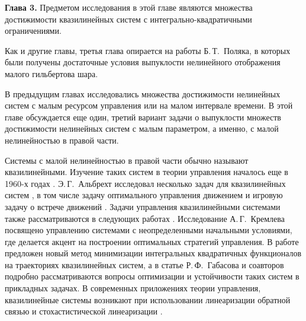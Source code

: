 \documentclass[../main.tex]{subfiles}
\begin{document}
\textbf{Глава 3. }
Предметом исследования в этой главе являются множества достижимости квазилинейных систем с интегрально-квадратичными ограничениями.

Как и другие главы, третья глава опирается на работы Б.\,Т.~Поляка\cite{Polyak2001}, в которых были получены достаточные условия выпуклости нелинейного отображения малого гильбертова шара.

В предыдущим главах исследовались множества достижимости нелинейных систем  с малым ресурсом управления или на малом интервале времени.
В этой главе обсуждается еще один, третий вариант задачи о выпуклости множеств достижимости нелинейных систем с малым параметром, а именно, с малой нелинейностью в правой части. 

Системы с малой нелинейностью в правой части обычно называют квазилинейными. 
Изучение таких систем в теории управления началось еще в 1960-х годах \cite{Subbotin, Kiselev, Kras_book}.
Э.\,Г.~Альбрехт исследовал несколько задач для квазилинейных систем \cite{Albrecht3}, в том числе задачу оптимального управления движением \cite{Albrecht1} и игровую задачу о встрече движений \cite{Albrecht2}.
Задачи управления квазилинейными системами также рассматриваются в следующих работах \cite{Dauer, Kremlev, KalininLavrinovich2018, Gabasov}.
Исследование А.\,Г.~Кремлева \cite{Kremlev} посвящено управлению системами с неопределенными начальными условиями, где делается акцент на построении оптимальных стратегий управления.
В работе \cite{KalininLavrinovich2018} предложен новый метод минимизации интегральных квадратичных функционалов на траекториях квазилинейных систем, а в статье Р.\,Ф.~Габасова и соавторов \cite{Gabasov} подробно рассматриваются вопросы оптимизации и устойчивости таких систем в прикладных задачах.
В современных приложениях теории управления, квазилинейные системы возникают при использовании линеаризации обратной связью и стохастистической линеаризации \cite{Ching, Gui}.
\end{document}
